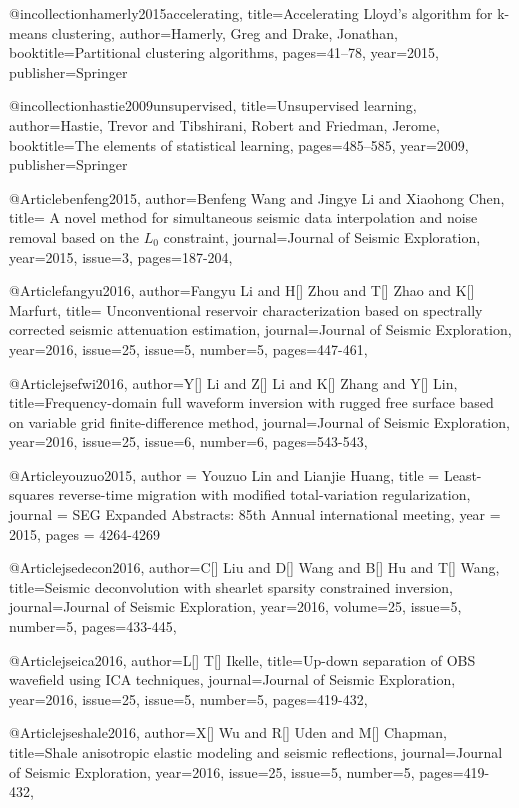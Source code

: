 @incollection{hamerly2015accelerating,
  title={Accelerating Lloyd’s algorithm for k-means clustering},
  author={Hamerly, Greg and Drake, Jonathan},
  booktitle={Partitional clustering algorithms},
  pages={41--78},
  year={2015},
  publisher={Springer}
}

@incollection{hastie2009unsupervised,
  title={Unsupervised learning},
  author={Hastie, Trevor and Tibshirani, Robert and Friedman, Jerome},
  booktitle={The elements of statistical learning},
  pages={485--585},
  year={2009},
  publisher={Springer}
}

@Article{benfeng2015,
  author={Benfeng Wang and Jingye Li and Xiaohong Chen},
  title={ A novel method for simultaneous seismic data interpolation and noise removal based on the $L_0$ constraint},
  journal={Journal of Seismic Exploration},
  year=2015,
  issue=3,
  pages={187-204},
}

@Article{fangyu2016,
  author={Fangyu Li and H[] Zhou and T[] Zhao and K[] Marfurt},
  title={ Unconventional reservoir characterization based on spectrally corrected seismic attenuation estimation},
  journal={Journal of Seismic Exploration},
  year=2016,
  issue=25,
  issue=5,
  number=5,
  pages={447-461},
}

@Article{jsefwi2016,
  author={Y[] Li and Z[] Li and K[] Zhang and Y[] Lin},
  title={Frequency-domain full waveform inversion with rugged free surface based on variable grid finite-difference method},
  journal={Journal of Seismic Exploration},
  year=2016,
  issue=25,
  issue=6,
  number=6,
  pages={543-543},
}

@Article{youzuo2015,
  author = 	 {Youzuo Lin and Lianjie Huang},
  title = 	 {Least-squares reverse-time migration with modified total-variation regularization},
  journal = 	 {SEG Expanded Abstracts: 85th Annual international meeting},
  year = 	 2015,
  pages =	 {4264-4269}
}


@Article{jsedecon2016,
  author={C[] Liu and D[] Wang and B[] Hu and T[] Wang},
  title={Seismic deconvolution with shearlet sparsity constrained inversion},
  journal={Journal of Seismic Exploration},
  year=2016,
  volume=25,
  issue=5,
  number=5,
  pages={433-445},
}

@Article{jseica2016,
  author={L[] T[] Ikelle},
  title={Up-down separation of OBS wavefield using ICA techniques},
  journal={Journal of Seismic Exploration},
  year=2016,
  issue=25,
  issue=5,
  number=5,
  pages={419-432},
}

@Article{jseshale2016,
  author={X[] Wu and R[] Uden and M[] Chapman},
  title={Shale anisotropic elastic modeling and seismic reflections},
  journal={Journal of Seismic Exploration},
  year=2016,
  issue=25,
  issue=5,
  number=5,
  pages={419-432},
}


